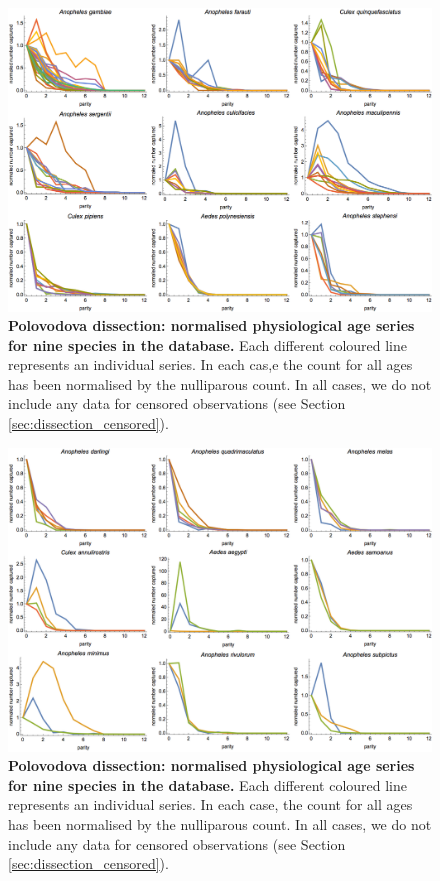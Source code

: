 \documentclass[12pt]{article}
\begin{document}
{\begin{figure}[ht]
	\centerline{\includegraphics[width=1.3\textwidth]{./Figure_files/dissection_parity_data1.png}}
	\caption{\textbf{Polovodova dissection: normalised physiological age series for nine species in the database.} Each different coloured line represents an individual series. In each cas,e the count for all ages has been normalised by the nulliparous count. In all cases, we do not include any data for censored observations (see Section \ref{sec:dissection_censored}).}\label{fig:dissection_exampleData1}
\end{figure}

\begin{figure}[ht]
	\centerline{\includegraphics[width=1.3\textwidth]{./Figure_files/dissection_parity_data2.png}}
	\caption{\textbf{Polovodova dissection: normalised physiological age series for nine species in the database.} Each different coloured line represents an individual series. In each case, the count for all ages has been normalised by the nulliparous count. In all cases, we do not include any data for censored observations (see Section \ref{sec:dissection_censored}).}\label{fig:dissection_exampleData2}
\end{figure}

}
\end{document}
